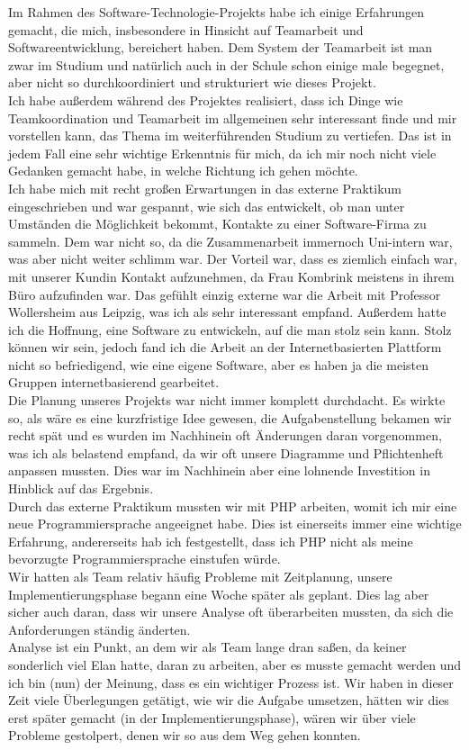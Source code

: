 \documentclass[a4paper]{scrreprt}
\begin{document}
Im Rahmen des Software-Technologie-Projekts habe ich einige Erfahrungen gemacht, die mich, insbesondere in Hinsicht auf Teamarbeit und Softwareentwicklung, bereichert haben. Dem System der Teamarbeit ist man zwar im Studium und natürlich auch in der Schule schon einige male begegnet, aber nicht so durchkoordiniert und strukturiert wie dieses Projekt.\\
Ich habe außerdem während des Projektes realisiert, dass ich Dinge wie Teamkoordination und Teamarbeit im allgemeinen sehr interessant finde und mir vorstellen kann, das Thema im weiterführenden Studium zu vertiefen. Das ist in jedem Fall eine sehr wichtige Erkenntnis für mich, da ich mir noch nicht viele Gedanken gemacht habe, in welche Richtung ich gehen möchte.\\
Ich habe mich mit recht großen Erwartungen in das externe Praktikum eingeschrieben und war gespannt, wie sich das entwickelt, ob man unter Umständen die Möglichkeit bekommt, Kontakte zu einer Software-Firma zu sammeln. Dem war nicht so, da die Zusammenarbeit immernoch Uni-intern war, was aber nicht weiter schlimm war. Der Vorteil war, dass es ziemlich einfach war, mit unserer Kundin Kontakt aufzunehmen, da Frau Kombrink meistens in ihrem Büro aufzufinden war. Das gefühlt einzig externe war die Arbeit mit Professor Wollersheim aus Leipzig, was ich als sehr interessant empfand. Außerdem hatte ich die Hoffnung, eine Software zu entwickeln, auf die man stolz sein kann. Stolz können wir sein, jedoch fand ich die Arbeit an der Internetbasierten Plattform nicht so befriedigend, wie eine eigene Software, aber es haben ja die meisten Gruppen internetbasierend gearbeitet.\\
Die Planung unseres Projekts war nicht immer komplett durchdacht. Es wirkte so, als wäre es eine kurzfristige Idee gewesen, die Aufgabenstellung bekamen wir recht spät und es wurden im Nachhinein oft Änderungen daran vorgenommen, was ich als belastend empfand, da wir oft unsere Diagramme und Pflichtenheft anpassen mussten. Dies war im Nachhinein aber eine lohnende Investition in Hinblick auf das Ergebnis.\\
Durch das externe Praktikum mussten wir mit PHP arbeiten, womit ich mir eine neue Programmiersprache angeeignet habe. Dies ist einerseits immer eine wichtige Erfahrung, andererseits hab ich festgestellt, dass ich PHP nicht als meine bevorzugte Programmiersprache einstufen würde.\\
Wir hatten als Team relativ häufig Probleme mit Zeitplanung, unsere Implementierungsphase begann eine Woche später als geplant. Dies lag aber sicher auch daran, dass wir unsere Analyse oft überarbeiten mussten, da sich die Anforderungen ständig änderten.\\
Analyse ist ein Punkt, an dem wir als Team lange dran saßen, da keiner sonderlich viel Elan hatte, daran zu arbeiten, aber es musste gemacht werden und ich bin (nun) der Meinung, dass es ein wichtiger Prozess ist. Wir haben in dieser Zeit viele Überlegungen getätigt, wie wir die Aufgabe umsetzen, hätten wir dies erst später gemacht (in der Implementierungsphase), wären wir über viele Probleme gestolpert, denen wir so aus dem Weg gehen konnten.\\
\end{document}
